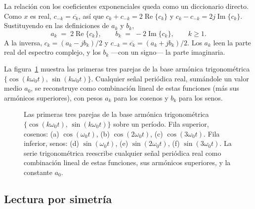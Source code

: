 \documentclass[class=book, crop=false]{standalone}
\begin{document}
La relación con los coeficientes exponenciales queda como un
diccionario directo. Como $x$ es real, $c_{-k} = \overline{c_k}$, así
que $c_k + c_{-k} = 2\operatorname{Re}\{c_k\}$ y $c_k - c_{-k} =
2j\operatorname{Im}\{c_k\}$. Sustituyendo en las definiciones de
$a_k$ y $b_k$,
\begin{equation}
    a_k \;=\; 2\operatorname{Re}\{c_k\},
    \qquad
    b_k \;=\; -2\operatorname{Im}\{c_k\},
    \qquad k \geq 1.
    \label{eq:diccionario_trig_exp}
\end{equation}
A la inversa, $c_k = (a_k - jb_k)/2$ y $c_{-k} = \overline{c_k} =
(a_k + jb_k)/2$. Los $a_k$ leen la parte real del espectro complejo,
y los $b_k$ ---con un signo--- la parte imaginaria.

La figura~\ref{fig:base_trigonometrica} muestra las primeras tres
parejas de la base armónica trigonométrica
$\{\cos(k\omega_0 t),\,\sin(k\omega_0 t)\}$. Cualquier señal
periódica real, sumándole un valor medio $a_0$, se reconstruye como
combinación lineal de estas funciones (más sus armónicos
superiores), con pesos $a_k$ para los cosenos y $b_k$ para los
senos.

\begin{figure}[H]
    \centering
    \begin{minipage}{\linewidth}
        \centering
        
        \caption{Las primeras tres parejas de la base armónica
                 trigonométrica $\{\cos(k\omega_0 t),\,\sin(k\omega_0 t)\}$
                 sobre un período.
                 Fila superior, cosenos:
                 (a) $\cos(\omega_0 t)$, (b) $\cos(2\omega_0 t)$,
                 (c) $\cos(3\omega_0 t)$.
                 Fila inferior, senos:
                 (d) $\sin(\omega_0 t)$, (e) $\sin(2\omega_0 t)$,
                 (f) $\sin(3\omega_0 t)$. La serie trigonométrica
                 reescribe cualquier señal periódica real como
                 combinación lineal de estas funciones, sus armónicos
                 superiores, y la constante $a_0$.}
        \label{fig:base_trigonometrica}
    \end{minipage}
\end{figure}

\subsection{Lectura por simetría}
\label{subsec:trig_simetrias}
\end{document}
